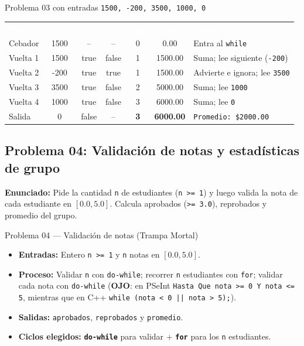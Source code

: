 \documentclass[11pt,letterpaper]{article}
\begin{document}
\begin{pruebaescritorio}{Problema 03 con entradas \texttt{1500, -200, 3500, 1000, 0}}
\begin{center}
\footnotesize
\setlength{\tabcolsep}{4pt}
\renewcommand{\arraystretch}{1.15}
\begin{tabularx}{\linewidth}{l c c c c c X}
\rowcolor{AzulMarino}
\textcolor{white}{\textbf{Paso}} & \textcolor{white}{\texttt{precio}} & \textcolor{white}{\texttt{!= 0}} & \textcolor{white}{\texttt{< 0}} & \textcolor{white}{\texttt{cant}} & \textcolor{white}{\texttt{total}} & \textcolor{white}{\textbf{Acción / Salida}} \\
Cebador & 1500 & -- & -- & 0 & 0.00 & Entra al \texttt{while} \\
Vuelta 1 & 1500 & true & false & 1 & 1500.00 & Suma; lee siguiente (\texttt{-200}) \\
Vuelta 2 & -200 & true & true & 1 & 1500.00 & Advierte e ignora; lee \texttt{3500} \\
Vuelta 3 & 3500 & true & false & 2 & 5000.00 & Suma; lee \texttt{1000} \\
Vuelta 4 & 1000 & true & false & 3 & 6000.00 & Suma; lee \texttt{0} \\
Salida & 0 & false & -- & \textbf{3} & \textbf{6000.00} & \texttt{Promedio: \$2000.00} \\
\bottomrule
\end{tabularx}
\end{center}
\end{pruebaescritorio}

\subsection{Problema 04: Validación de notas y estadísticas de grupo}

\textbf{Enunciado:} Pide la cantidad \texttt{n} de estudiantes (\texttt{n >= 1}) y luego valida la nota de cada estudiante en $[0.0, 5.0]$. Calcula aprobados (\texttt{>= 3.0}), reprobados y promedio del grupo.

\begin{analisis}{Problema 04 --- Validación de notas (Trampa Mortal)}
\begin{itemize}
  \item \textbf{Entradas:} Entero \texttt{n >= 1} y \texttt{n} notas en $[0.0, 5.0]$.
  \item \textbf{Proceso:} Validar \texttt{n} con \texttt{do-while}; recorrer \texttt{n} estudiantes con \texttt{for}; validar cada nota con \texttt{do-while} (\textbf{OJO}: en PSeInt \texttt{Hasta Que nota >= 0 Y nota <= 5}, mientras que en C++ \texttt{while (nota < 0 || nota > 5);}).
  \item \textbf{Salidas:} \texttt{aprobados}, \texttt{reprobados} y \texttt{promedio}.
  \item \textbf{Ciclos elegidos:} \textbf{\texttt{do-while}} para validar + \textbf{\texttt{for}} para los \texttt{n} estudiantes.
\end{itemize}
\end{analisis}
\end{document}
